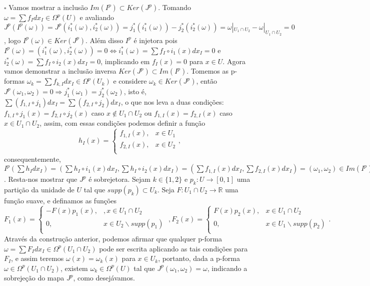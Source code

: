 \documentclass{article}
\begin{document}
	$\square$ Vamos mostrar a inclusão $Im(I^{p}) \subset Ker(J^{p})$. Tomando $\omega = \sum f_{I}dx_{I} \in \Omega^{p}(U)$ e avaliando $J^{p}(I^{p}(\omega)) = J^{p}(i^{*}_{1}(\omega), i^{*}_{2}(\omega)) = j^{*}_{1}(i^{*}_{1}(\omega))- j^{*}_{2}(i^{*}_{2}(\omega)) = \omega|_{U_{1} \cap U_{2}} - \omega|_{U_{1} \cap U_{2}} = 0$, logo $I^{p}(\omega) \in Ker(J^{p})$. Além disso $I^{p}$ é injetora pois $I^{p}(\omega) = (i^{*}_{1}(\omega), i^{*}_{2}(\omega)) = 0 \iff i^{*}_{1}(\omega)=\sum f_{I}\circ i_{1}(x) dx_{I} = 0$ e $i^{*}_{2}(\omega) = \sum f_{I}\circ i_{2}(x) dx_{I} = 0$, implicando em $f_{I}(x) = 0$ para $x \in U$.  Agora vamos demonstrar a inclusão inversa $Ker(J^{p})\subset Im(I^{p})$. Tomemos as p-formas $\omega_{k} = \sum f_{k,I} dx_{I} \in \Omega^{p}(U_{k})$ e considere $\omega_{k} \in Ker(J^{p})$, então $J^{p}(\omega_{1}, \omega_{2}) = 0 \Rightarrow j^{*}_{1}(\omega_{1}) = j^{*}_{2}(\omega_{2})$, isto é, $\sum (f_{1,I}\circ j_{1}) dx_{I} = \sum (f_{2,I}\circ j_{2}) dx_{I}$, o que nos leva a duas condições: $f_{1,I}\circ j_{1}(x) = f_{2,I}\circ j_{2}(x)$ caso $x \notin U_{1} \cap U_{2}$ ou $f_{1,I}(x) = f_{2,I}(x)$ caso $x \in U_{1} \cap U_{2}$, assim, com essas condições podemos definir a função 
	$$
	h_{I}(x) = \left\{
	\begin{array}{cc}
	f_{1,I}(x), & x \in U_{1} \\
	f_{2,I}(x), & x \in U_{2} \\
	\end{array},
	\right.
	$$
	consequentemente, $I^{p}(\sum h_{I}dx_{I}) = (\sum h_{I}\circ i_{1}(x)dx_{I}, \sum h_{I}\circ i_{2}(x)dx_{I}) = (\sum f_{1,I}(x)dx_{I}, \sum f_{2,I}(x)dx_{I}) = (\omega_{1}, \omega_{2}) \in Im(I^{p})$. Resta-nos mostrar que $J^{p}$ é sobrejetora. Sejam $k \in \{1,2\}$ e $p_{k}: U \to [0,1]$ uma partição da unidade de $U$ tal que $supp(p_{k}) \subset U_{k}$. Seja $F: U_{1} \cap U_{2} \to \mathbb{R}$ uma função suave, e definamos as funções
	$$
	F_{1}(x) = \left\{
	\begin{array}{cc}
	-F(x)p_{1}(x), &, x \in U_{1} \cap U_{2} \\
	0, & x \in U_{2}\backslash supp(p_{1})\\
	\end{array}
	\right.
	\; ,F_{2}(x) = \left\{
	\begin{array}{cc}
	F(x)p_{2}(x), & x \in U_{1} \cap U_{2} \\
	0, & x \in U_{1}\backslash supp(p_{2}) \\
	\end{array}.
	\right.
	$$ 
	Através da construção anterior, podemos afirmar que qualquer p-forma $\omega = \sum F_{I}dx_{I} \in \Omega^{p}( U_{1} \cap U_{2})$ pode ser escrita aplicando as tais condições para $F_{I}$, e assim teremos $\omega(x) = \omega_{k}(x)$ para $x \in U_{k}$, portanto, dada a p-forma $\omega \in \Omega^{p}( U_{1} \cap U_{2})$, existem $\omega_{k} \in \Omega^{p}(U)$ tal que $J^{p}(\omega_{1}, \omega_{2}) = \omega$, indicando a sobrejeção do mapa $J^{p}$, como desejávamos. 
	
\end{document}
